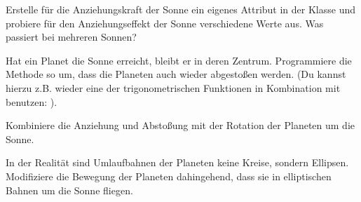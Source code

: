 \documentclass[10pt, a4paper]{arbeitsblatt}
\begin{document}
\begin{aufgabe*}
Erstelle für die Anziehungskraft der Sonne ein eigenes Attribut in der Klasse  und probiere für den Anziehungseffekt der Sonne verschiedene Werte aus. Was passiert bei mehreren Sonnen?

Hat ein Planet die Sonne erreicht, bleibt er in deren Zentrum. Programmiere die  Methode so um, dass die Planeten auch wieder abgestoßen werden. (Du kannst hierzu z.B. wieder eine der trigonometrischen Funktionen in Kombination mit  benutzen: ).

Kombiniere die Anziehung und Abstoßung mit der Rotation der Planeten um die Sonne.
\end{aufgabe*}

\begin{aufgabe*}
In der Realität sind Umlaufbahnen der Planeten keine Kreise, sondern Ellipsen. Modifiziere die Bewegung der Planeten dahingehend, dass sie in elliptischen Bahnen um die Sonne fliegen.
\end{aufgabe*}
\end{document}
